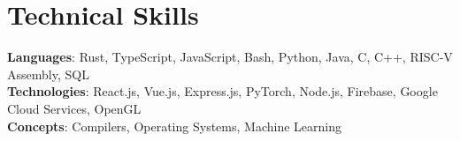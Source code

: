 \documentclass[letterpaper,11pt]{article}
\begin{document}
\section{Technical Skills}
 \begin{itemize}[leftmargin=0.15in, label={}]
    \small{\item{
      \textbf{Languages}{: Rust, TypeScript, JavaScript, Bash, Python, Java, C, C++, RISC-V Assembly, SQL} \\
      \textbf{Technologies}{: React.js, Vue.js, Express.js, PyTorch, Node.js, Firebase, Google Cloud Services, OpenGL} \\
      \textbf{Concepts}{: Compilers, Operating Systems, Machine Learning}
    }}
 \end{itemize}
\end{document}
